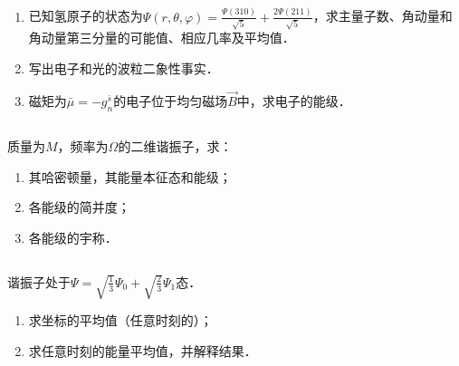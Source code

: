 
\subsection{ }
\begin{enumerate}
\item 已知氢原子的状态为$\varPsi (r,\theta,\varphi)=\frac{\varPsi (310)}{\sqrt{5}}+\frac{2\varPsi (211)}{\sqrt{5}}$，求主量子数、角动量和角动量第三分量的可能值、相应几率及平均值．
\item 写出电子和光的波粒二象性事实．
\item 磁矩为$\bar{\mu}=-g^{\bar{s}}_{n}$的电子位于均匀磁场$\vec{B}$中，求电子的能级．
\end{enumerate}
\subsection{ }
质量为$M$，频率为$\Omega$的二维谐振子，求：\\
\begin{enumerate}
\item 其哈密顿量，其能量本征态和能级；
\item 各能级的简并度；
\item 各能级的宇称．
\end{enumerate}
\subsection{ }
谐振子处于$\varPsi =\sqrt{\frac{1}{3}}\varPsi_{0}+\sqrt{\frac{2}{3}}\varPsi_{1}$态．
\begin{enumerate}
\item 求坐标的平均值（任意时刻的）；
\item 求任意时刻的能量平均值，并解释结果．
\end{enumerate}